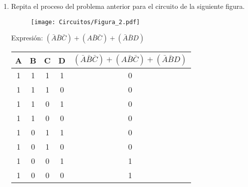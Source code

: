 \documentclass[a4paper, 12pt]{article}
\newcommand{\Aspace}{0.2cm}
\begin{document}
\begin{enumerate}
        \newpage
        \item Repita el proceso del problema anterior para el circuito de la siguiente figura. \par
        \begin{figure}[!ht]
            \centering
            \texttt{[image: Circuitos/Figura\_2.pdf]}
        \end{figure}
            \vspace{\Aspace} \par
            { \color{azul} Expresión: $(\bar{A} \bar{B} \bar{C}) + (A \bar{B} \bar{C}) + (\bar{A} \bar{B} D)$ \par \vspace{0.5cm}
                \begin{tabular}{c|c|c|c|c}
                    \textbf{A}  &   \textbf{B}  &   \textbf{C}  &   \textbf{D}  &   $(\bar{A} \bar{B} \bar{C}) + (A \bar{B} \bar{C}) + (\bar{A} \bar{B} D)$     \\ \hline
                    1           &   1           &   1           &   1           &   0                                                                           \\
                    1           &   1           &   1           &   0           &   0                                                                           \\
                    1           &   1           &   0           &   1           &   0                                                                           \\
                    1           &   1           &   0           &   0           &   0                                                                           \\
                    1           &   0           &   1           &   1           &   0                                                                           \\
                    1           &   0           &   1           &   0           &   0                                                                           \\
                    1           &   0           &   0           &   1           &   1                                                                           \\
                    1           &   0           &   0           &   0           &   1                                                                           \\

\end{tabular}}
\end{enumerate}
\end{document}
